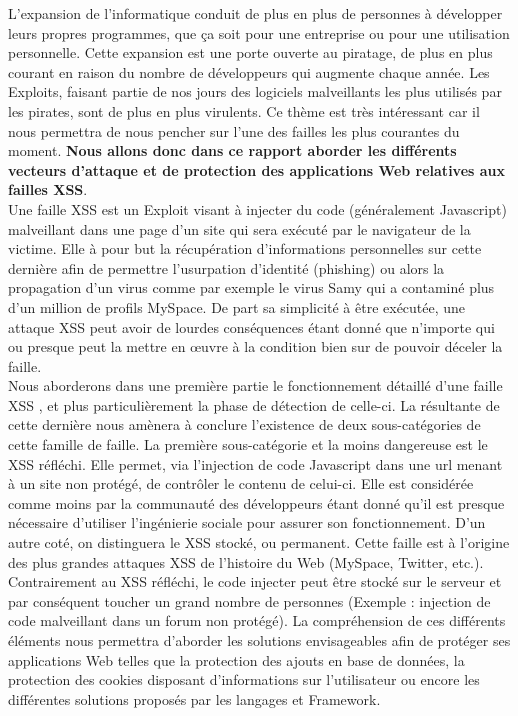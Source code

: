\documentclass[a4paper,12pt]{report}
\begin{document}
L’expansion de l’informatique conduit de plus en plus de personnes à développer leurs propres programmes, que ça soit pour une entreprise ou pour une utilisation personnelle. Cette expansion est une porte ouverte au piratage, de plus en plus courant en raison du nombre de développeurs qui augmente chaque année. Les Exploits, faisant partie de nos jours des logiciels malveillants les plus utilisés par les pirates, sont de plus en plus virulents.
Ce thème est très intéressant car il nous permettra de nous pencher sur l'une des failles les plus courantes du moment. \textbf{Nous allons donc dans ce rapport aborder les différents vecteurs d'attaque et de protection des applications Web relatives aux failles XSS}.\\

Une faille XSS est un Exploit visant à injecter du code (généralement Javascript) malveillant dans une page d'un site qui sera exécuté par le navigateur de la victime. Elle à pour but la récupération d'informations personnelles sur cette dernière afin de permettre l'usurpation d'identité (phishing) ou alors la propagation d'un virus comme par exemple le virus Samy qui a  contaminé plus d'un million de profils MySpace. De part sa simplicité à être exécutée, une attaque XSS peut avoir de lourdes conséquences étant donné que n'importe qui ou presque peut la mettre en œuvre à la condition bien sur de pouvoir déceler la faille.\\

Nous aborderons dans une première partie le fonctionnement détaillé d'une faille XSS , et plus particulièrement la phase de détection de celle-ci. La résultante de cette dernière nous amènera à conclure l'existence de deux sous-catégories de cette famille de faille. La première sous-catégorie et la moins dangereuse est le XSS réfléchi. Elle permet, via l'injection de code Javascript dans une url menant à un site non protégé, de contrôler le contenu de celui-ci. Elle est considérée comme moins par la communauté des développeurs étant donné qu'il est presque nécessaire d'utiliser l'ingénierie sociale pour assurer son fonctionnement. D'un autre coté, on distinguera le XSS stocké, ou permanent. Cette faille est à l'origine des plus grandes attaques XSS de l'histoire du Web (MySpace, Twitter, etc.). Contrairement au XSS réfléchi, le code injecter peut être stocké sur le serveur et par conséquent toucher un grand nombre de personnes (Exemple : injection de code malveillant dans un forum non protégé). La compréhension de ces différents éléments nous permettra d'aborder les solutions envisageables afin de protéger ses applications Web telles que la protection des ajouts en base de données, la protection des cookies disposant d'informations sur l'utilisateur ou encore les différentes solutions proposés par les langages et Framework.  \\
\end{document}
